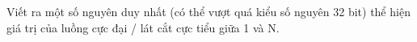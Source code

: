 Viết ra một số nguyên duy nhất (có thể vượt quá kiểu số nguyên 32 bit) thể hiện giá trị của luồng cực đại / lát cắt cực tiểu giữa 1 và N.
